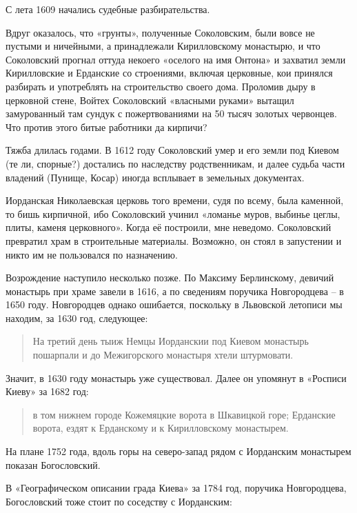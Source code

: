 С лета 1609 начались судебные разбирательства.

Вдруг оказалось, что «грунты», полученные Соколовским, были вовсе не пустыми и ничейными, а принадлежали Кирилловскому монастырю, и что Соколовский прогнал оттуда некоего «оселого на имя Онтона» и захватил земли Кирилловские и Ерданские со строениями, включая церковные, кои принялся разбирать и употреблять на строительство своего дома. Проломив дыру в церковной стене, Войтех Соколовский «власными руками» вытащил замурованный там сундук с пожертвованиями на 50 тысяч золотых червонцев. Что против этого битые работники да кирпичи?

Тяжба длилась годами. В 1612 году Соколовский умер и его земли под Киевом (те ли, спорные?) достались по наследству родственникам, и далее судьба части владений (Пунище, Косар) иногда всплывает в земельных документах.

Иорданская Николаевская церковь того времени, судя по всему, была каменной, то бишь кирпичной, ибо Соколовский учинил «ломанье муров, выбинье цеглы, плиты, каменя церковного». Когда её построили, мне неведомо. Соколовский превратил храм в строительные материалы. Возможно, он стоял в запустении и никто им не пользовался по назначению.

Возрождение наступило несколько позже. По Максиму Берлинскому, девичий монастырь при храме завели в 1616, а по сведениям поручика Новгородцева – в 1650 году. Новгородцев однако ошибается, поскольку в Львовской летописи мы находим, за 1630 год, следующее:

\begin{quotation}
На третий день тыиж Немцы Иорданскии под Киевом монастырь пошарпали и до Межигорского монастыря хтели штурмовати.
\end{quotation}

Значит, в 1630 году монастырь уже существовал. Далее он упомянут в «Росписи Киеву» за 1682 год:

\begin{quotation}
в том нижнем городе Кожемяцкие ворота в Шкавицкой горе; Ерданские ворота, ездят к Ерданскому и к Кирилловскому монастырем.
\end{quotation}

На плане 1752 года, вдоль горы на северо-запад рядом с Иорданским монастырем показан Богословский. 

В «Географическом описании града Киева» за 1784 год, поручика Новгородцева, Богословский тоже стоит по соседству с Иорданским: 

